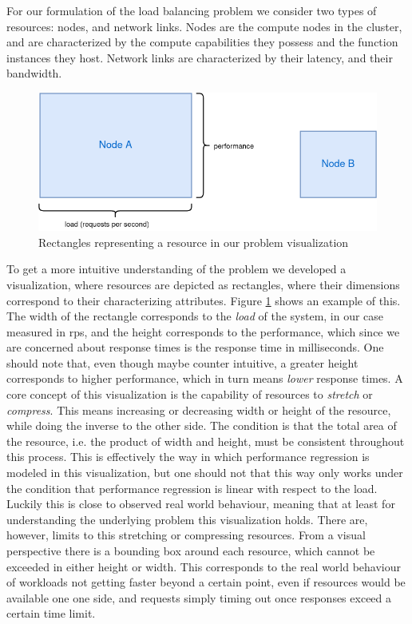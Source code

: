 \documentclass[draft,final]{vutinfth} %
\begin{document}
For our formulation of the load balancing problem we consider two types of resources: nodes, and network links. Nodes are the compute nodes in the cluster, and are characterized by the compute capabilities they possess and the function instances they host. Network links are characterized by their latency, and their bandwidth.
\begin{figure}
    \centering
    \includegraphics[width=12cm]{graphics/diagrams/load_balancer_squares.png}
    \caption{Rectangles representing a resource in our problem visualization}
    \label{fig:lb_squares_basic}
\end{figure}
To get a more intuitive understanding of the problem we developed a visualization, where resources are depicted as rectangles, where their dimensions correspond to their characterizing attributes. Figure \ref{fig:lb_squares_basic} shows an example of this. The width of the rectangle corresponds to the \textit{load} of the system, in our case measured in \gls{rps}, and the height corresponds to the performance, which since we are concerned about response times is the response time in milliseconds. One should note that, even though maybe counter intuitive, a greater height corresponds to higher performance, which in turn means \textit{lower} response times.
A core concept of this visualization is the capability of resources to \textit{stretch} or \textit{compress}. This means increasing or decreasing width or height of the resource, while doing the inverse to the other side. The condition is that the total area of the resource, i.e. the product of width and height, must be consistent throughout this process. This is effectively the way in which performance regression is modeled in this visualization, but one should not that this way only works under the condition that performance regression is linear with respect to the load. Luckily this is close to observed real world behaviour, %
meaning that at least for understanding the underlying problem this visualization holds.
There are, however, limits to this stretching or compressing resources. From a visual perspective there is a bounding box around each resource, which cannot be exceeded in either height or width. This corresponds to the real world behaviour of workloads not getting faster beyond a certain point, even if resources would be available one one side, and requests simply timing out once responses exceed a certain time limit.
\end{document}

